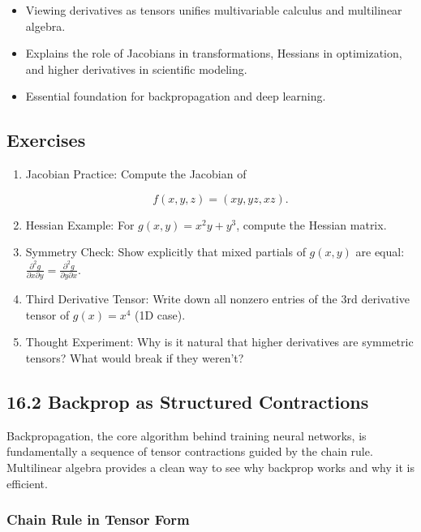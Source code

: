 \documentclass[
  letterpaper,
  DIV=11,
  numbers=noendperiod]{scrreprt}
\providecommand{\tightlist}{%
  \setlength{\itemsep}{0pt}\setlength{\parskip}{0pt}}
\begin{document}
\begin{itemize}
\tightlist
\item
  Viewing derivatives as tensors unifies multivariable calculus and
  multilinear algebra.
\item
  Explains the role of Jacobians in transformations, Hessians in
  optimization, and higher derivatives in scientific modeling.
\item
  Essential foundation for backpropagation and deep learning.
\end{itemize}

\subsection{Exercises}\label{exercises-56}

\begin{enumerate}
\def\labelenumi{\arabic{enumi}.}
\item
  Jacobian Practice: Compute the Jacobian of

  \[
  f(x,y,z) = (xy, yz, xz).
  \]
\item
  Hessian Example: For \(g(x,y) = x^2y + y^3\), compute the Hessian
  matrix.
\item
  Symmetry Check: Show explicitly that mixed partials of \(g(x,y)\) are
  equal:
  \(\frac{\partial^2 g}{\partial x \partial y} = \frac{\partial^2 g}{\partial y \partial x}\).
\item
  Third Derivative Tensor: Write down all nonzero entries of the 3rd
  derivative tensor of \(g(x) = x^4\) (1D case).
\item
  Thought Experiment: Why is it natural that higher derivatives are
  symmetric tensors? What would break if they weren't?
\end{enumerate}

\subsection{16.2 Backprop as Structured
Contractions}\label{backprop-as-structured-contractions}

Backpropagation, the core algorithm behind training neural networks, is
fundamentally a sequence of tensor contractions guided by the chain
rule. Multilinear algebra provides a clean way to see why backprop works
and why it is efficient.

\subsubsection{Chain Rule in Tensor
Form}\label{chain-rule-in-tensor-form}
\end{document}
